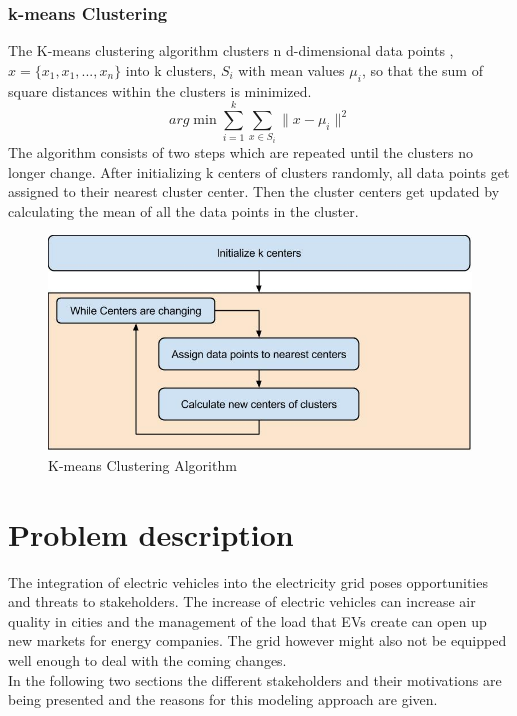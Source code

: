 \documentclass[a4paper]{article}
\begin{document}
\subsubsection{k-means  Clustering}
The K-means clustering algorithm clusters n d-dimensional data points ,$x=\{ x_1,x_1,..., x_n\}$ into k clusters, $S_i$ with mean values $\mu_i$, so that the sum of square distances within the clusters is minimized. 
\begin{equation}
arg \min \sum_{i=1}^k \sum_{x \in S_i}\| x- \mu_i \|^2
\end{equation}
The algorithm consists of two steps which are repeated until the clusters no longer change. After initializing k centers of clusters randomly, all data points get assigned to their nearest cluster center. Then the cluster centers get updated by calculating the mean of all the data points in the cluster. 
\begin{figure}[!ht]
\includegraphics[width =\textwidth]{K-means_alg.jpg}
\caption{K-means Clustering Algorithm}
\label{k-means_picture}
\end{figure}

\newpage

\section{Problem description}
The integration of electric vehicles into the electricity grid poses opportunities and threats to stakeholders. 
The increase of electric vehicles can increase air quality in cities and the management of the load that 
EVs create can open up new markets for energy companies. The grid however might also not be equipped well enough to 
deal with the coming changes.\\
In the following two sections the different stakeholders and their motivations are being presented and the reasons for 
this modeling approach are given.
\end{document}
